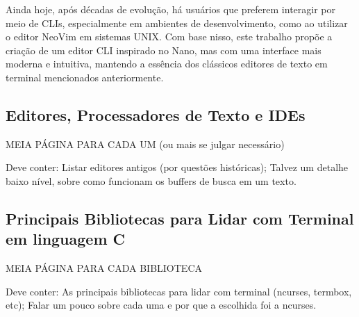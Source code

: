 Ainda hoje, após décadas de evolução, há usuários que preferem interagir por meio de CLIs, especialmente em ambientes de desenvolvimento, como ao utilizar o
editor NeoVim em sistemas UNIX. Com base nisso, este trabalho propõe a criação de um editor CLI inspirado no Nano, mas com uma interface mais moderna e
intuitiva, mantendo a essência dos clássicos editores de texto em terminal mencionados anteriormente.

\subsection{Editores, Processadores de Texto e IDEs}

MEIA PÁGINA PARA CADA UM (ou mais se julgar necessário)

Deve conter: Listar editores antigos (por questões históricas); Talvez um detalhe baixo nível, sobre como funcionam os buffers de busca
em um texto.

\subsection{Principais Bibliotecas para Lidar com Terminal em linguagem C} %

MEIA PÁGINA PARA CADA BIBLIOTECA

Deve conter: As principais bibliotecas para lidar com terminal (ncurses, termbox, etc); Falar um pouco sobre cada uma e
por que a escolhida foi a ncurses.
